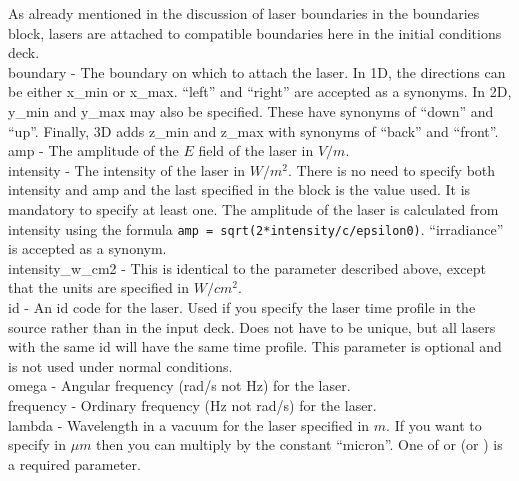 As already mentioned in the discussion of laser boundaries in the boundaries
block, lasers are attached to compatible boundaries here in the initial
conditions deck.\\

{\emphtext boundary} - The boundary on which to attach the laser.
  In 1D, the directions can be either x\_min or x\_max.  ``left'' and ``right''
  are accepted as a synonyms. In 2D, y\_min and y\_max may also be specified.
  These have synonyms of ``down'' and ``up''. Finally, 3D adds z\_min and z\_max
  with synonyms of ``back'' and ``front''.\\

{\emphtext amp} - The amplitude of the $E$ field of the laser in $V/m$.\\

{\emphtext intensity} - The intensity of the laser in $W/m^2$.
  There is no need to specify both intensity and amp and the last specified
  in the block is the value used. It is mandatory to specify at least one.
  The amplitude of the laser is calculated from intensity using the formula
  \verb|amp = sqrt(2*intensity/c/epsilon0)|.
  ``irradiance'' is accepted as a synonym.\\

{\emphtext intensity\_w\_cm2} - This is identical to the
   parameter described above, except that the units
  are specified in $W/cm^2$.\\

{\emphtext id} - An id code for the laser. Used if you specify the laser time
  profile in the {\EPOCH} source rather than in the input deck. Does not have to
  be unique, but all lasers with the same id will have the same time profile.
  This parameter is optional and is not used under normal conditions.\\

{\emphtext omega} - Angular frequency (rad/s not Hz) for the laser.\\

{\emphtext frequency} - Ordinary frequency (Hz not rad/s) for the laser.\\

{\emphtext lambda} - Wavelength in a vacuum for the laser specified in $m$.
  If you want to specify in $\mu m$ then you can multiply by the constant
  ``micron''. One of  or  (or
  ) is a required parameter.\\

